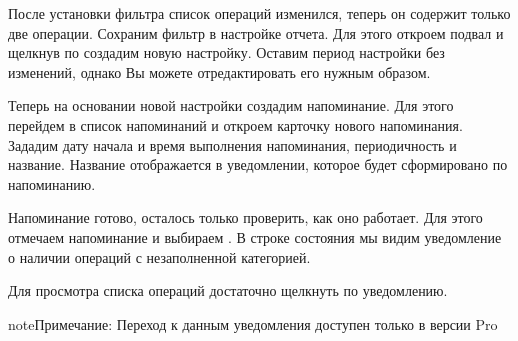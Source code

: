\documentclass[a4paper,10pt,russian]{sphinxmanual}
\begin{document}
\sphinxAtStartPar
После установки фильтра список операций изменился, теперь он содержит только две операции. Сохраним фильтр
в настройке отчета. Для этого откроем подвал и щелкнув по  создадим
новую настройку. Оставим период настройки без изменений, однако Вы можете отредактировать его нужным образом.

\noindent{}

\noindent{}

\noindent{}

\sphinxAtStartPar
Теперь на основании новой настройки создадим напоминание. Для этого перейдем в список напоминаний и
откроем карточку нового напоминания. Зададим дату начала и время выполнения напоминания, периодичность и название. Название
отображается в уведомлении, которое будет сформировано по напоминанию.

\noindent{}

\noindent{}

\noindent{}

\sphinxAtStartPar
Напоминание готово, осталось только проверить, как оно работает. Для этого отмечаем напоминание и выбираем
. В строке состояния мы видим уведомление о наличии операций с незаполненной категорией.

\noindent{}

\noindent{}

\noindent{}

\sphinxAtStartPar
Для просмотра списка операций достаточно щелкнуть по уведомлению.

\begin{sphinxadmonition}{note}{Примечание:}
\sphinxAtStartPar
Переход к данным уведомления доступен только в версии Pro
\end{sphinxadmonition}
\end{document}
